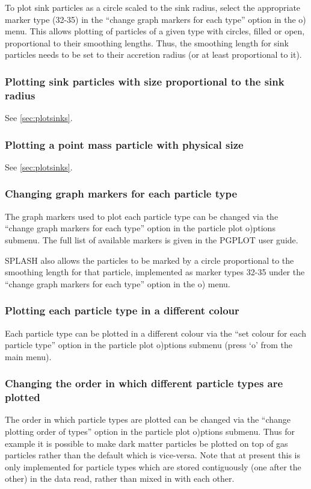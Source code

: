 \documentclass[a4paper,10pt]{article}
\begin{document}
  To plot sink particles as a circle scaled to the sink radius, select the appropriate marker type (32-35) in the ``change graph markers for each type'' option in the o) menu. This allows plotting of particles of a given type with circles, filled or open, proportional to their smoothing lengths. Thus, the smoothing length for sink particles needs to be set to their accretion radius (or at least proportional to it).

\subsubsection{ Plotting sink particles with size proportional to the sink radius}
See \ref{sec:plotsinks}.

\subsubsection{ Plotting a point mass particle with physical size}
See \ref{sec:plotsinks}.

\subsubsection{ Changing graph markers for each particle type}
 The graph markers used to plot each particle type can be changed via the ``change graph markers for each type'' option in the particle plot o)ptions submenu. The full list of available markers is given in the PGPLOT user guide. 
 
  SPLASH also allows the particles to be marked by a circle proportional to the smoothing length for that particle, implemented as marker types 32-35 under the ``change graph markers for each type'' option in the o) menu.

\subsubsection{ Plotting each particle type in a different colour}
\label{sec:partcolours}
 Each particle type can be plotted in a different colour via the ``set colour for each particle type'' option in the particle plot o)ptions submenu (press `o' from the main menu).
 
\subsubsection{ Changing the order in which different particle types are plotted}
 The order in which particle types are plotted can be changed via the ``change plotting order of types'' option in the particle plot o)ptions submenu. Thus for example it is possible to make dark matter particles be plotted on top of gas particles rather than the default which is vice-versa. Note that at present this is only implemented for particle types which are stored contiguously (one after the other) in the data read, rather than mixed in with each other.
\end{document}
